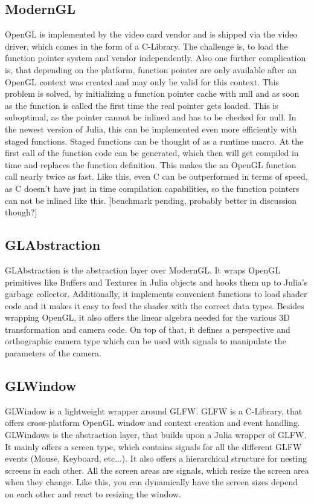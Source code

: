 \subsection{ModernGL}
OpenGL is implemented by the video card vendor and is shipped via the video driver, which comes in the form of a C-Library.
The challenge is, to load the function pointer system and vendor independently. Also one further complication is, that depending on the platform, function pointer are only available after an OpenGL context was created and may only be valid for this context. \cite{wgl}
This problem is solved, by initializing a function pointer cache with null and as soon as the function is called the first time the real pointer gets loaded. This is suboptimal, as the pointer cannot be inlined and has to be checked for null.
In the newest version of Julia, this can be implemented even more efficiently with staged functions. Staged functions can be thought of as a runtime macro.
At the first call of the function code can be generated, which then will get compiled in time and replaces the function definition. 
This makes the an OpenGL function call nearly twice as fast.
Like this, even C can be outperformed in terms of speed, as C doesn't have just in time compilation capabilities, so the function pointers can not be inlined like this. [benchmark pending, probably better in discussion though?]


\subsection{GLAbstraction}
GLAbstraction is the abstraction layer over ModernGL.
It wraps OpenGL primitives like Buffers and Textures in Julia objects and hooks them up to Julia's garbage collector.
Additionally, it implements convenient functions to load shader code and it makes it easy to feed the shader with the correct data types.
Besides wrapping OpenGL, it also offers the linear algebra needed for the various 3D transformation and camera code.
On top of that, it defines a perspective and orthographic camera type which can be used with signals to manipulate the parameters of the camera.


\subsection{GLWindow}
GLWindow is a lightweight wrapper around GLFW. GLFW is a C-Library, that offers cross-platform OpenGL window and context creation and event handling.
GLWindows is the abstraction layer, that builds upon a Julia wrapper of GLFW.
It mainly offers a screen type, which contains signals for all the different GLFW events (Mouse, Keyboard, etc...). 
It also offers a hierarchical structure for nesting screens in each other. 
All the screen areas are signals, which resize the screen area when they change. Like this, you can dynamically have the screen sizes depend on each other and react to resizing the window.



